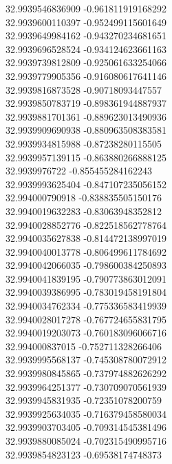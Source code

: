 {32.9939546836909	-0.961811919168292\\
32.9939600110397	-0.952499115601649\\
32.9939649984162	-0.943270234681651\\
32.9939696528524	-0.934124623661163\\
32.9939739812809	-0.925061633254066\\
32.9939779905356	-0.916080617641146\\
32.9939816873528	-0.90718093447557\\
32.9939850783719	-0.898361944887937\\
32.9939881701361	-0.889623013490936\\
32.9939909690938	-0.880963508383581\\
32.9939934815988	-0.87238280115505\\
32.9939957139115	-0.863880266888125\\
32.9939976722	-0.855455284162243\\
32.9939993625404	-0.847107235056152\\
32.994000790918	-0.838835505150176\\
32.9940019632283	-0.83063948352812\\
32.9940028852776	-0.822518562778764\\
32.9940035627838	-0.814472138997019\\
32.9940040013778	-0.806499611784692\\
32.9940042066035	-0.798600384250893\\
32.9940041839195	-0.790773863012091\\
32.9940039386995	-0.783019458191804\\
32.9940034762334	-0.775336583419939\\
32.9940028017278	-0.767724655831795\\
32.9940019203073	-0.760183096066716\\
32.994000837015	-0.752711328266406\\
32.9939995568137	-0.745308780072912\\
32.9939980845865	-0.737974882626292\\
32.9939964251377	-0.730709070561939\\
32.9939945831935	-0.72351078200759\\
32.9939925634035	-0.716379458580034\\
32.9939903703405	-0.709314545381496\\
32.9939880085024	-0.702315490995716\\
32.9939854823123	-0.69538174748373\\
}
